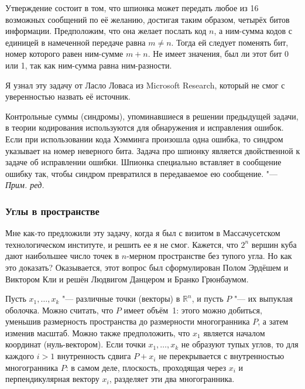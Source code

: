 \documentclass[twoside]{book}
\newenvironment{addedbytheeditors}{\par\medskip\small
}{\par\addvspace{\medskipamount}} %
\begin{document}
Утверждение состоит в том, что шпионка может передать любое из 16 возможных сообщений по её желанию,
достигая таким образом, четырёх битов информации.
Предположим, что она желает послать код $n$, а ним-сумма кодов с единицей в намеченной передаче равна $m\ne n$.
Тогда ей следует поменять бит, номер которого равен ним-сумме $m+n$.
Не имеет значения, был ли этот бит 0 или 1, так как ним-сумма равна ним-разности.
\heart

\medskip

Я узнал эту задачу от Ласло Ловаса из Microsoft Research, который не смог с уверенностью назвать её источник.

\begin{addedbytheeditors}
Контрольные суммы (синдромы), упоминавшиеся  в решении предыдущей задачи, в теории кодирования используются для обнаружения и исправления ошибок.
Если при использовании кода Хэмминга произошла одна ошибка, то синдром указывает на номер неверного бита.
Задача про шпионку является двойственной к задаче об исправлении ошибки.
Шпионка специально вставляет в сообщение ошибку так, чтобы синдром превратился в передаваемое ею сообщение.
"--- \emph{Прим. ред.}  
\end{addedbytheeditors}

\subsubsection*{Углы в пространстве}

Мне как-то предложили эту задачу, когда я был с визитом в
Массачусетском технологическом институте, и решить ее я не смог.
Кажется, что $2^n$ вершин куба дают наибольшее число точек в $n$-мерном пространстве без тупого угла.
Но как это доказать?
Оказывается, этот вопрос был сформулирован Полом Эрдёшем и Виктором Кли и решён Людвигом Данцером и Бранко Грюнбаумом. %

\medskip

Пусть $x_1,\dots,x_k$ "--- различные точки (векторы) в $\mathbb{R}^n$, и пусть $P$ "--- их выпуклая оболочка.
Можно считать, что $P$ имеет объём~1:
этого можно добиться, уменьшив размерность пространства до размерности многогранника $P$, а затем изменив масштаб.
Можно также предположить, что $x_1$ является началом координат (нуль-вектором).
Если точки $x_1,\dots,x_k$ не образуют тупых углов, то для каждого $i>1$ внутренность сдвига $P+x_i$ не перекрывается с внутренностью многогранника $P$:
в самом деле, плоскость, проходящая через $x_i$ и перпендикулярная вектору $x_i$, разделяет эти два многогранника.
\end{document}
